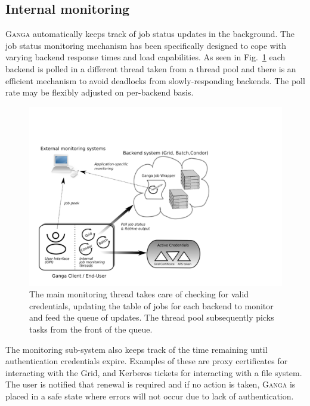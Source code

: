 \documentclass{elsart}
\def\ganga {\textsc{Ganga}\xspace}
\def\grid {Grid\xspace}
\begin{document}
\subsection{Internal monitoring}
\label{sec:GangaMonitoring}
\ganga automatically keeps track of job status updates in the background.  The
job status monitoring mechanism has been specifically designed to cope with
varying backend response times and load capabilities. As seen in
Fig.~\ref{fig:job_status_monitoring_mechanism} each backend is polled in a
different thread taken from a thread pool and there is an efficient mechanism
to avoid deadlocks from slowly-responding backends. The poll rate may be
flexibly adjusted on per-backend basis.
\begin{figure}[htbp]
  \begin{center}
    \includegraphics[width=1 \textwidth]{monitoring.pdf}
    \caption{The main monitoring thread takes care of checking for valid
      credentials, updating the table of jobs for each backend to monitor and
      feed the queue of updates. The thread pool subsequently picks tasks from
      the front of the queue.}
    \label{fig:job_status_monitoring_mechanism}
  \end{center}
\end{figure}

The monitoring sub-system also keeps track of the time remaining until
authentication credentials expire. Examples of these are proxy certificates
for interacting with the \grid, and Kerberos  tickets for interacting with a
file system. The user is notified that renewal is required and if no action is
taken, \ganga is placed in a safe state where errors will not occur due to
lack of authentication.
\end{document}
